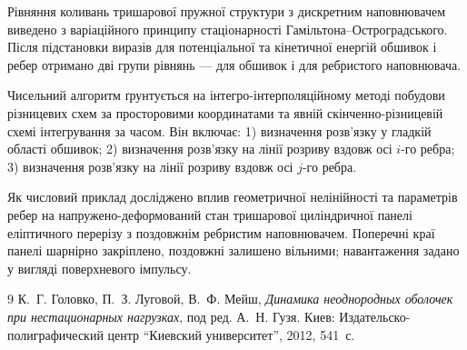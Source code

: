 Рівняння коливань тришарової пружної структури з дискретним наповнювачем виведено з варіаційного принципу стаціонарності Гамільтона--Остроградського. Після підстановки виразів для потенціальної та кінетичної енергій обшивок і ребер отримано дві групи рівнянь --- для обшивок і для ребристого наповнювача.

Чисельний алгоритм ґрунтується на інтегро-інтерполяційному методі побудови різницевих схем за просторовими координатами та явній скінченно-різницевій схемі інтегрування за часом. Він включає: 1) визначення розв’язку у гладкій області обшивок; 2) визначення розв’язку на лінії розриву вздовж осі $i$-го ребра; 3) визначення розв’язку на лінії розриву вздовж осі $j$-го ребра.

Як числовий приклад досліджено вплив геометричної нелінійності та параметрів ребер на напружено-деформований стан тришарової циліндричної панелі еліптичного перерізу з поздовжнім ребристим наповнювачем. Поперечні краї панелі шарнірно закріплено, поздовжні залишено вільними; навантаження задано у вигляді поверхневого імпульсу.

\begin{thebibliography}{9}
К.~Г. Головко, П.~З. Луговой, В.~Ф. Мейш,
\emph{Динамика неоднородных оболочек при нестационарных нагрузках}, под ред. А.~Н. Гузя.
Киев: Издательско-полиграфический центр ``Киевский университет'', 2012, 541~с.
\end{thebibliography}
